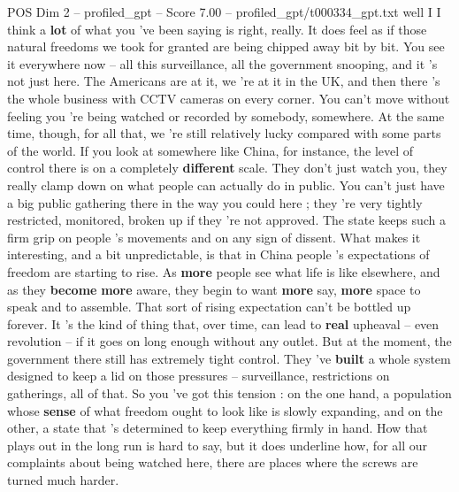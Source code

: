 \begin{textsample}{POS Dim 2 – profiled\_gpt – Score 7.00 – profiled\_gpt/t000334\_gpt.txt}  \label{ex:f2_pos_008}
well I I think a \textbf{lot} of what you ’ve been saying is right, really.
It does feel as if those natural freedoms we took for granted are being chipped away bit by bit.
You see it everywhere now – all this surveillance, all the government snooping, and it ’s not just here.
The Americans are at it, we ’re at it in the UK, and then there ’s the whole business with CCTV cameras on every corner.
You can't move without feeling you ’re being watched or recorded by somebody, somewhere.
At the same time, though, for all that, we ’re still relatively lucky compared with some parts of the world.
If you look at somewhere like China, for instance, the level of control there is on a completely \textbf{different} scale.
They don't just watch you, they really clamp down on what people can actually do in public.
You can't just have a big public gathering there in the way you could here ; they ’re very tightly restricted, monitored, broken up if they ’re not approved.
The state keeps such a firm grip on people ’s movements and on any sign of dissent.
What makes it interesting, and a bit unpredictable, is that in China people ’s expectations of freedom are starting to rise.
As \textbf{more} people see what life is like elsewhere, and as they \textbf{become} \textbf{more} aware, they begin to want \textbf{more} say, \textbf{more} space to speak and to assemble.
That sort of rising expectation can't be bottled up forever.
It ’s the kind of thing that, over time, can lead to \textbf{real} upheaval – even revolution – if it goes on long enough without any outlet.
But at the moment, the government there still has extremely tight control.
They ’ve \textbf{built} a whole system designed to keep a lid on those pressures – surveillance, restrictions on gatherings, all of that.
So you ’ve got this tension : on the one hand, a population whose \textbf{sense} of what freedom ought to look like is slowly expanding, and on the other, a state that ’s determined to keep everything firmly in hand.
How that plays out in the long run is hard to say, but it does underline how, for all our complaints about being watched here, there are places where the screws are turned much harder.

\end{textsample}
